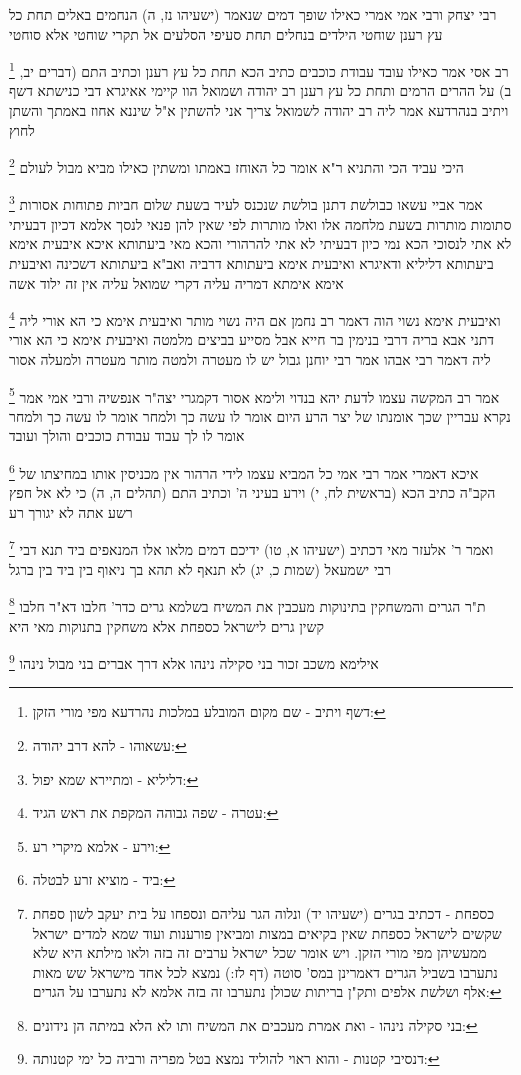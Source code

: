 \documentclass[12pt, openany]{book}
\newcommand{\footnotecomment}[1]{
	\renewcommand\thefootnote{}
	\footnote{#1}}
\newcommand{\commenta}[1]{\footnotecomment{#1}}
\begin{document}
{{רבי יצחק ורבי אמי אמרי כאילו שופך דמים שנאמר (ישעיהו נז, ה) הנחמים באלים תחת כל עץ רענן שוחטי הילדים בנחלים תחת סעיפי הסלעים אל תקרי שוחטי אלא סוחטי 
\commenta{דשף ויתיב - שם מקום המובלע במלכות נהרדעא מפי מורי הזקן:}
רב אסי אמר כאילו עובד עבודת כוכבים כתיב הכא תחת כל עץ רענן וכתיב התם (דברים יב, ב) על ההרים הרמים ותחת כל עץ רענן 
רב יהודה ושמואל הוו קיימי אאיגרא דבי כנישתא דשף ויתיב בנהרדעא אמר ליה רב יהודה לשמואל צריך אני להשתין א"ל שיננא אחוז באמתך והשתן לחוץ 
\commenta{עשאוהו - להא דרב יהודה:}
היכי עביד הכי והתניא ר"א אומר כל האוחז באמתו ומשתין כאילו מביא מבול לעולם 
\commenta{דליליא - ומתיירא שמא יפול:}
אמר אביי עשאו כבולשת דתנן בולשת שנכנס לעיר בשעת שלום חביות פתוחות אסורות סתומות מותרות בשעת מלחמה אלו ואלו מותרות לפי שאין להן פנאי לנסך אלמא דכיון דבעיתי לא אתי לנסוכי הכא נמי כיון דבעיתי לא אתי להרהורי 
והכא מאי ביעתותא איכא איבעית אימא ביעתותא דליליא ודאיגרא ואיבעית אימא ביעתותא דרביה ואב"א ביעתותא דשכינה ואיבעית אימא אימתא דמריה עליה דקרי שמואל עליה אין זה ילוד אשה 
\commenta{עטרה - שפה גבוהה המקפת את ראש הגיד:}
ואיבעית אימא נשוי הוה דאמר רב נחמן אם היה נשוי מותר 
ואיבעית אימא כי הא אורי ליה דתני אבא בריה דרבי בנימין בר חייא אבל מסייע בביצים מלמטה ואיבעית אימא כי הא אורי ליה דאמר רבי אבהו אמר רבי יוחנן גבול יש לו מעטרה ולמטה מותר
מעטרה ולמעלה אסור 
\commenta{וירע - אלמא מיקרי רע:}
אמר רב המקשה עצמו לדעת יהא בנדוי ולימא אסור דקמגרי יצה"ר אנפשיה ורבי אמי אמר נקרא עבריין שכך אומנתו של יצר הרע היום אומר לו עשה כך ולמחר אומר לו עשה כך ולמחר אומר לו לך עבוד עבודת כוכבים והולך ועובד 
\commenta{ביד - מוציא זרע לבטלה:}
איכא דאמרי אמר רבי אמי כל המביא עצמו לידי הרהור אין מכניסין אותו במחיצתו של הקב"ה כתיב הכא (בראשית לח, י) וירע בעיני ה' וכתיב התם (תהלים ה, ה) כי לא אל חפץ רשע אתה לא יגורך רע 
\commenta{כספחת - דכתיב בגרים (ישעיהו יד) ונלוה הגר עליהם ונספחו על בית יעקב לשון ספחת שקשים לישראל כספחת שאין בקיאים במצות ומביאין פורענות ועוד שמא למדים ישראל ממעשיהן מפי מורי הזקן. ויש אומר שכל ישראל ערבים זה בזה ולאו מילתא היא שלא נתערבו בשביל הגרים דאמרינן במס' סוטה (דף לז:) נמצא לכל אחד מישראל שש מאות אלף ושלשת אלפים ותק"ן בריתות שכולן נתערבו זה בזה אלמא לא נתערבו על הגרים:}
ואמר ר' אלעזר מאי דכתיב (ישעיהו א, טו) ידיכם דמים מלאו אלו המנאפים ביד תנא דבי רבי ישמעאל (שמות כ, יג) לא תנאף לא תהא בך ניאוף בין ביד בין ברגל 
\commenta{בני סקילה נינהו - ואת אמרת מעכבים את המשיח ותו לא הלא במיתה הן נידונים:}
ת"ר הגרים והמשחקין בתינוקות מעכבין את המשיח בשלמא גרים כדר' חלבו דא"ר חלבו קשין גרים לישראל כספחת אלא משחקין בתנוקות מאי היא 
\commenta{דנסיבי קטנות - והוא ראוי להוליד נמצא בטל מפריה ורביה כל ימי קטנותה:}
אילימא משכב זכור בני סקילה נינהו אלא דרך אברים בני מבול נינהו 
}}
\end{document}
